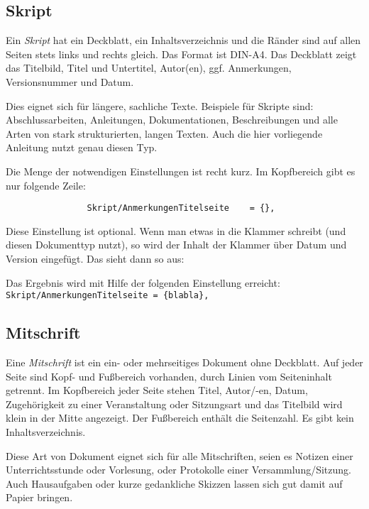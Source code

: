 			\subsection{Skript}

				Ein \emph{Skript} hat ein Deckblatt, ein Inhaltsverzeichnis und die Ränder sind auf allen Seiten stets links und rechts gleich. Das Format ist DIN-A4. Das Deckblatt zeigt das Titelbild, Titel und Untertitel, Autor(en), ggf. Anmerkungen, Versionsnummer und Datum.

				Dies eignet sich für längere, sachliche Texte. Beispiele für Skripte sind: Abschlussarbeiten, Anleitungen, Dokumentationen, Beschreibungen und alle Arten von stark strukturierten, langen Texten. Auch die hier vorliegende Anleitung nutzt genau diesen Typ.

				Die Menge der notwendigen Einstellungen ist recht kurz. Im Kopfbereich gibt es nur folgende Zeile:

				\begin{verbatim}
				Skript/AnmerkungenTitelseite 	= {},
				\end{verbatim}

				Diese Einstellung ist optional. Wenn man etwas in die Klammer schreibt (und diesen Dokumenttyp nutzt), so wird der Inhalt der Klammer über Datum und Version eingefügt. Das sieht dann so aus:

				\begin{center}
				\end{center}

				Das Ergebnis wird mit Hilfe der folgenden Einstellung erreicht: \\
				\texttt{Skript/AnmerkungenTitelseite = \{blabla\},}

			\subsection{Mitschrift}

				Eine \emph{Mitschrift} ist ein ein- oder mehrseitiges Dokument ohne Deckblatt. Auf jeder Seite sind Kopf- und Fußbereich vorhanden, durch Linien vom Seiteninhalt getrennt. Im Kopfbereich jeder Seite stehen Titel, Autor/-en, Datum, Zugehörigkeit zu einer Veranstaltung oder Sitzungsart und das Titelbild wird klein in der Mitte angezeigt. Der Fußbereich enthält die Seitenzahl. Es gibt kein Inhaltsverzeichnis.

				Diese Art von Dokument eignet sich für alle Mitschriften, seien es Notizen einer Unterrichtsstunde oder Vorlesung, oder Protokolle einer Versammlung/Sitzung. Auch Hausaufgaben oder kurze gedankliche Skizzen lassen sich gut damit auf Papier bringen.

